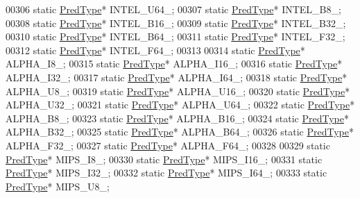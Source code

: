 \begin{DoxyCode}
00306         \textcolor{keyword}{static} \hyperlink{class_h5_1_1_pred_type}{PredType}* INTEL\_U64\_;
00307         \textcolor{keyword}{static} \hyperlink{class_h5_1_1_pred_type}{PredType}* INTEL\_B8\_;
00308         \textcolor{keyword}{static} \hyperlink{class_h5_1_1_pred_type}{PredType}* INTEL\_B16\_;
00309         \textcolor{keyword}{static} \hyperlink{class_h5_1_1_pred_type}{PredType}* INTEL\_B32\_;
00310         \textcolor{keyword}{static} \hyperlink{class_h5_1_1_pred_type}{PredType}* INTEL\_B64\_;
00311         \textcolor{keyword}{static} \hyperlink{class_h5_1_1_pred_type}{PredType}* INTEL\_F32\_;
00312         \textcolor{keyword}{static} \hyperlink{class_h5_1_1_pred_type}{PredType}* INTEL\_F64\_;
00313 
00314         \textcolor{keyword}{static} \hyperlink{class_h5_1_1_pred_type}{PredType}* ALPHA\_I8\_;
00315         \textcolor{keyword}{static} \hyperlink{class_h5_1_1_pred_type}{PredType}* ALPHA\_I16\_;
00316         \textcolor{keyword}{static} \hyperlink{class_h5_1_1_pred_type}{PredType}* ALPHA\_I32\_;
00317         \textcolor{keyword}{static} \hyperlink{class_h5_1_1_pred_type}{PredType}* ALPHA\_I64\_;
00318         \textcolor{keyword}{static} \hyperlink{class_h5_1_1_pred_type}{PredType}* ALPHA\_U8\_;
00319         \textcolor{keyword}{static} \hyperlink{class_h5_1_1_pred_type}{PredType}* ALPHA\_U16\_;
00320         \textcolor{keyword}{static} \hyperlink{class_h5_1_1_pred_type}{PredType}* ALPHA\_U32\_;
00321         \textcolor{keyword}{static} \hyperlink{class_h5_1_1_pred_type}{PredType}* ALPHA\_U64\_;
00322         \textcolor{keyword}{static} \hyperlink{class_h5_1_1_pred_type}{PredType}* ALPHA\_B8\_;
00323         \textcolor{keyword}{static} \hyperlink{class_h5_1_1_pred_type}{PredType}* ALPHA\_B16\_;
00324         \textcolor{keyword}{static} \hyperlink{class_h5_1_1_pred_type}{PredType}* ALPHA\_B32\_;
00325         \textcolor{keyword}{static} \hyperlink{class_h5_1_1_pred_type}{PredType}* ALPHA\_B64\_;
00326         \textcolor{keyword}{static} \hyperlink{class_h5_1_1_pred_type}{PredType}* ALPHA\_F32\_;
00327         \textcolor{keyword}{static} \hyperlink{class_h5_1_1_pred_type}{PredType}* ALPHA\_F64\_;
00328 
00329         \textcolor{keyword}{static} \hyperlink{class_h5_1_1_pred_type}{PredType}* MIPS\_I8\_;
00330         \textcolor{keyword}{static} \hyperlink{class_h5_1_1_pred_type}{PredType}* MIPS\_I16\_;
00331         \textcolor{keyword}{static} \hyperlink{class_h5_1_1_pred_type}{PredType}* MIPS\_I32\_;
00332         \textcolor{keyword}{static} \hyperlink{class_h5_1_1_pred_type}{PredType}* MIPS\_I64\_;
00333         \textcolor{keyword}{static} \hyperlink{class_h5_1_1_pred_type}{PredType}* MIPS\_U8\_;

\end{DoxyCode}
